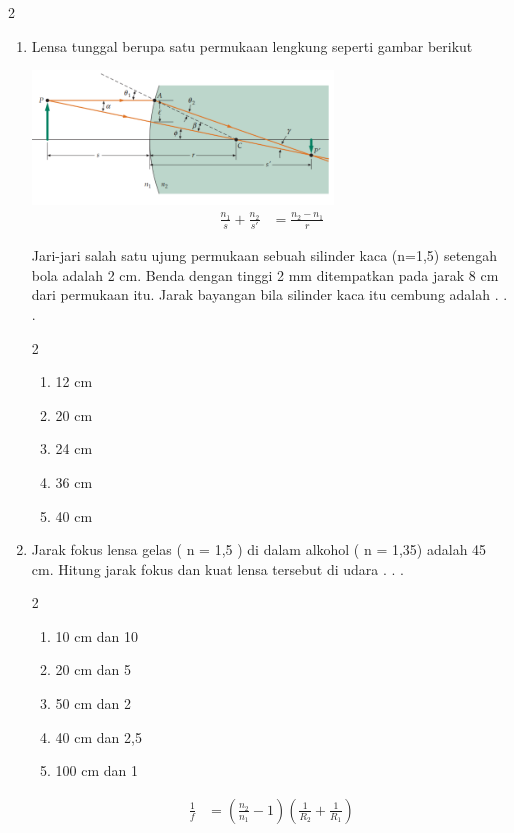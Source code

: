 \documentclass[11pt,a4paper]{extarticle}
\newcommand{\pilgani}[1]{                            \vspace{-0.3cm}\begin{multicols}{2}
 \begin{enumerate}[label=\Alph*., itemsep=0pt,topsep=0pt,leftmargin=*,align=Center]#1                     \end{enumerate}
 \phantom{ini cuma sapi, wedus, dan ayam}
 \end{multicols}}
\begin{document}
\begin{multicols*}{2}
\begin{enumerate}
\item Lensa tunggal berupa satu permukaan lengkung seperti gambar berikut

\graphicspath{ {pic/} }
\includegraphics[width=8cm]{rumuslensasingle}
\begin{align*}
\frac{n_1}{s}+\frac{n_2}{s'}&=\frac{n_2-n_1}{r}
\end{align*}

Jari-jari salah satu ujung permukaan sebuah silinder kaca (n=1,5) setengah bola adalah 2 cm. Benda dengan tinggi 2 mm ditempatkan pada jarak 8 cm dari permukaan itu. Jarak bayangan bila silinder kaca itu cembung adalah . . .
\pilgani{
        \item 12 cm
        \item 20 cm
        \item 24 cm
        \item 36 cm
        \item 40 cm
        }
\item Jarak fokus lensa gelas ( n = 1,5 ) di dalam alkohol ( n = 1,35) adalah 45 cm. Hitung jarak fokus dan kuat lensa tersebut di udara . . .
\pilgani{
        \item 10 cm dan 10 
        \item 20 cm dan 5
        \item 50 cm dan 2
        \item 40 cm dan 2,5
        \item 100 cm dan 1
        }

\begin{align*}
\frac{1}{f}&= \left ( \frac{n_2}{n_1} -1 \right) \left( \frac{1}{R_2}+\frac{1}{R_1} \right )
\end{align*}

\end{enumerate}

\end{multicols*}
\end{document}
